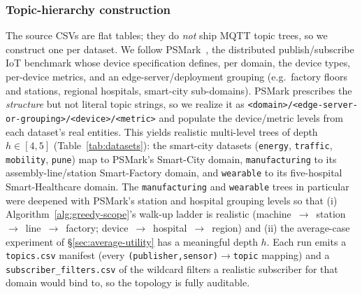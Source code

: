 \subsubsection{Topic-hierarchy construction}
\label{sec:topic-construction}
The source CSVs are flat tables; they do \emph{not} ship MQTT topic trees, so we construct one per dataset. We follow PSMark~\cite{CHRISTIAN}, the distributed publish/subscribe IoT benchmark whose device specification defines, per domain, the device types, per-device metrics, and an edge-server/deployment grouping (e.g.\ factory floors and stations, regional hospitals, smart-city sub-domains). PSMark prescribes the \emph{structure} but not literal topic strings, so we realize it as \texttt{<domain>/<edge-server-or-grouping>/<device>/<metric>} and populate the device/metric levels from each dataset's real entities. This yields realistic multi-level trees of depth $h\!\in\![4,5]$ (Table~\ref{tab:datasets}): the smart-city datasets (\texttt{energy}, \texttt{traffic}, \texttt{mobility}, \texttt{pune}) map to PSMark's Smart-City domain, \texttt{manufacturing} to its assembly-line/station Smart-Factory domain, and \texttt{wearable} to its five-hospital Smart-Healthcare domain. The \texttt{manufacturing} and \texttt{wearable} trees in particular were deepened with PSMark's station and hospital grouping levels so that (i) Algorithm~\ref{alg:greedy-scope}'s walk-up ladder is realistic (machine~$\to$~station~$\to$~line~$\to$~factory; device~$\to$~hospital~$\to$~region) and (ii) the average-case experiment of \S\ref{sec:average-utility} has a meaningful depth $h$. Each run emits a \texttt{topics.csv} manifest (every \texttt{(publisher,sensor)$\to$topic} mapping) and a \texttt{subscriber\_filters.csv} of the wildcard filters a realistic subscriber for that domain would bind to, so the topology is fully auditable.

